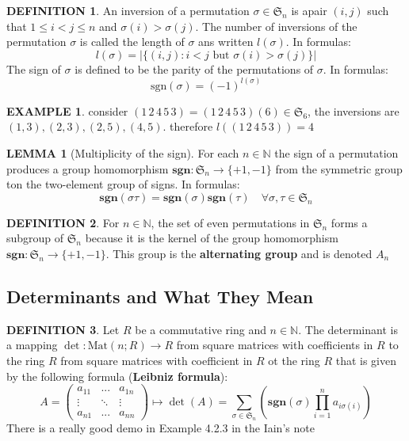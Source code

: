 \documentclass[12pt]{article}
\theoremstyle{definition}
\newtheorem{definition}{DEFINITION}[subsection]
\newcommand{\Mat}{\text{Mat}}
\newcommand{\sgn}{\textbf{sgn}}
\newtheorem{lemma}{LEMMA}[subsection]
\newtheorem{example}{EXAMPLE}[subsection]
\begin{document}
\begin{definition}
    An inversion of a permutation $\sigma \in \mathfrak{S}_n$ is  apair $(i,j)$ such that $1 \leq i < j \leq n$ and $\sigma(i) > \sigma(j)$. The number of inversions of the permutation $\sigma$ is called the length of $\sigma$ ans written $l(\sigma)$. In formulas:
    $$l(\sigma) = |\{(i,j): i < j \text{ but } \sigma(i) > \sigma(j)\}|$$
    The sign of $\sigma$ is defined to be the parity of the permutations of $\sigma$. In formulas:
    $$\text{sgn}(\sigma) = (-1)^{l(\sigma)}$$
\end{definition}

\begin{example}
    consider $(1\,2\,4\,5\,3) = (1\,2\,4\,5\,3)(6) \in \mathfrak{S}_6$, the inversions are $(1,3),(2,3),(2,5),(4,5)$. therefore $l((1\,2\,4\,5\,3)) = 4$
\end{example}

\begin{lemma}[Multiplicity of the sign]
    For each $n \in \mathbb{N}$ the sign of a permutation produces a group homomorphism $\textbf{sgn}: \mathfrak{S}_n \rightarrow \{+1,-1\}$ from the symmetric group ton the two-element group of signs. In formulas:
    $$\sgn(\sigma\tau) = \sgn(\sigma)\sgn(\tau) \quad \forall \sigma,\tau\in \mathfrak{S}_n$$
\end{lemma}

\begin{definition}
    For $n \in \mathbb{N}$, the set of even permutations in $\mathfrak{S}_n$ forms a subgroup of $\mathfrak{S}_n$ because it is the kernel of the group homomorphism $\sgn:\mathfrak{S}_n \rightarrow \{+1,-1\}$. This group is the \textbf{alternating group} and is denoted $A_n$
\end{definition}

\subsection{Determinants and What They Mean}
\begin{definition}
    Let $R$ be a commutative ring and $n \in \mathbb{N}$. The determinant is a mapping $\det : \Mat(n;R) \rightarrow R$ from square matrices with coefficients in $R$ to the ring $R$ from square matrices with coefficient in $R$ ot the ring $R$ that is given by the following formula (\textbf{Leibniz formula}):
    $$A = 
    \begin{pmatrix}
        a_{11} & ... & a_{1n}\\
        \vdots & \ddots & \vdots\\
        a_{n1} & ... & a_{nn}
    \end{pmatrix} \mapsto \det(A) = \sum_{\sigma \in \mathfrak{S}_n} \left(\sgn(\sigma)\prod_{i=1}^n a_{i\sigma (i)}\right)$$
    There is a really good demo in Example 4.2.3 in the Iain's note
\end{definition}
\end{document}
